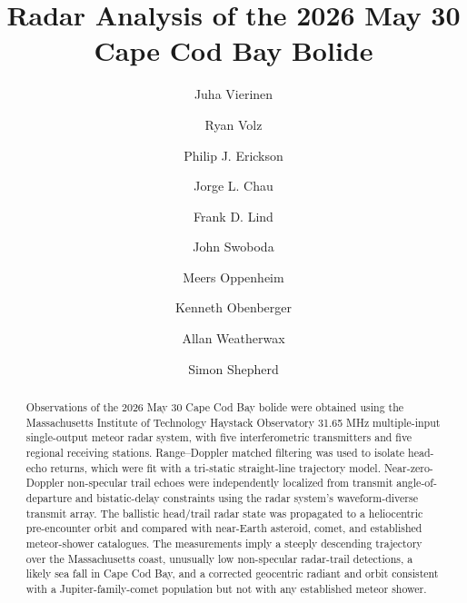 \documentclass[a4paper,fleqn,longmktitle]{cas-sc}
\begin{document}
\let\WriteBookmarks\relax
\def\floatpagepagefraction{1}
\def\textpagefraction{.001}


\title[mode=title]{Radar Analysis of the 2026 May 30 Cape Cod Bay Bolide}

\author[1,2]{Juha Vierinen}
\cormark[1]
\author[1]{Ryan Volz}
\author[1]{Philip J. Erickson}
\author[2]{Jorge L. Chau}
\author[1]{Frank D. Lind}
\author[1]{John Swoboda}
\author[3]{Meers Oppenheim}
\author[4]{Kenneth Obenberger}
\author[1]{Allan Weatherwax}
\author[5]{Simon Shepherd}







\begin{abstract}
Observations of the 2026 May 30 Cape Cod Bay bolide were obtained using the
Massachusetts Institute of Technology Haystack Observatory 31.65 MHz
multiple-input single-output meteor radar system, with five interferometric
transmitters and five regional receiving stations. Range--Doppler matched
filtering was used to isolate head-echo returns, which were fit with a
tri-static straight-line trajectory model. Near-zero-Doppler non-specular trail
echoes were independently localized from transmit angle-of-departure and
bistatic-delay constraints using the radar system's waveform-diverse transmit
array. The ballistic head/trail radar state was propagated to a heliocentric
pre-encounter orbit and compared with near-Earth asteroid, comet, and
established meteor-shower catalogues. The measurements imply a steeply
descending trajectory over the Massachusetts coast, unusually low
non-specular radar-trail detections, a likely sea fall in Cape Cod Bay, and a
corrected geocentric radiant and orbit consistent with a Jupiter-family-comet
population but not with any established meteor shower.
\end{abstract}
\end{document}
